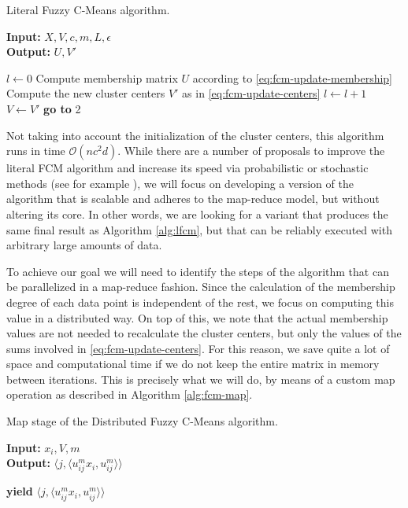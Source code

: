 \begin{algorithm}
  \caption{Literal Fuzzy C-Means algorithm.}
    \label{alg:lfcm}
    \textbf{Input:} $X,V,c,m,L, \epsilon$\\
    \textbf{Output:} $U,V'$
  \begin{algorithmic}[1]
    \State $l \gets 0$
    \State Compute membership matrix $U$ according to \eqref{eq:fcm-update-membership}
    \State Compute the new cluster centers $V'$ as in \eqref{eq:fcm-update-centers}
    \State $l \gets l+1$
     
      \State {}
    \Else
      \State $V \gets V'$
      \State \textbf{go to} 2
    \EndIf
  \end{algorithmic}
\end{algorithm}

Not taking into account the initialization of the cluster centers, this algorithm runs in time $\mathcal O(nc^2d)$. While there are a number of proposals to improve the literal FCM algorithm and increase its speed via probabilistic or stochastic methods (see for example \cite{pham2001probabilistic}), we will focus on developing a version of the algorithm that is scalable and adheres to the map-reduce model, but without altering its core. In other words, we are looking for a variant that produces the same final result as Algorithm \ref{alg:lfcm}, but that can be reliably executed with arbitrary large amounts of data.

To achieve our goal we will need to identify the steps of the algorithm that can be parallelized in a map-reduce fashion. Since the calculation of the membership degree of each data point is independent of the rest, we focus on computing this value in a distributed way. On top of this, we note that the actual membership values are not needed to recalculate the cluster centers, but only the values of the sums involved in \eqref{eq:fcm-update-centers}. For this reason, we save quite a lot of space and computational time if we do not keep the entire matrix in memory between iterations. This is precisely what we will do, by means of a custom map operation as described in Algorithm \ref{alg:fcm-map}.

\begin{algorithm}
  \caption{Map stage of the Distributed Fuzzy C-Means algorithm.}
    \label{alg:fcm-map}
    \textbf{Input:} $x_i,V,m$\\
    \textbf{Output:} $\langle j, \langle u_{ij}^m x_i, u_{ij}^m \rangle \rangle$
  \begin{algorithmic}[1]
      \State \textbf{yield} $\langle j, \langle u_{ij}^m x_i, u_{ij}^m \rangle \rangle$ 
    \EndFor
  \end{algorithmic}
\end{algorithm}


